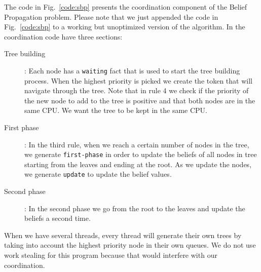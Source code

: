 The code in Fig.~\ref{code:sbp} presents the coordination component of the Belief Propagation problem.
Please note that we just appended the code in Fig.~\ref{code:sbp} to a working but unoptimized version
of the algorithm.
In the coordination code have three sections:
\begin{description}
   \item[Tree building]: Each node has a \texttt{waiting} fact that is used to start the tree building process. When the highest priority is picked we create the token that will navigate through the tree. Note that in rule 4 we check if the priority of the new node to add to the tree is positive and that both nodes are in the same CPU. We want the tree to be kept in the same CPU.
   \item[First phase]: In the third rule, when we reach a certain number of nodes in the tree, we generate \texttt{first-phase} in order to update the beliefs of all nodes in tree starting from the leaves and ending at the root. As we update the nodes, we generate \texttt{update} to update the belief values.
   \item[Second phase]: In the second phase we go from the root to the leaves and update the beliefs a second time.
\end{description}

When we have several threads, every thread will generate their own trees by taking into account the highest priority node in their own queues. We do not use work stealing for this program because that would interfere with our coordination.

